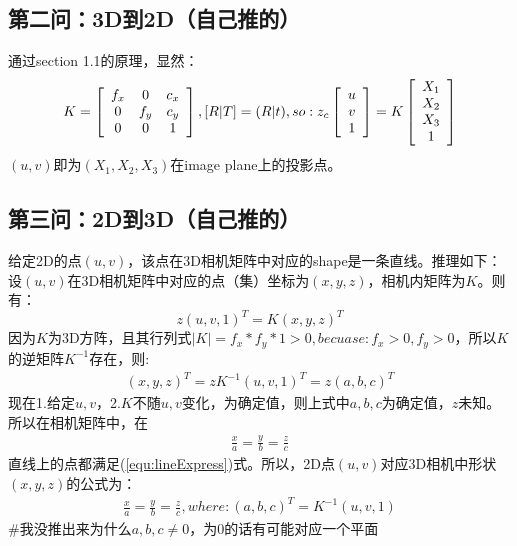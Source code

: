 \documentclass[UTF8]{ctexart}
\begin{document}
\subsection{第二问：3D到2D（自己推的）}
通过section 1.1的原理，显然：
\begin{align*}
K = \left [ \begin{array}{ c c c}
f_x & 0   & c_x \\
0  & f_y & c_y \\
0  & 0   & 1 \\
\end{array} \right ],
[R|T]=(R|t), so:
 z_c \left[ \begin{array}{c}  u \\ v \\ 1 \end{array} \right] =
 K \left[ \begin{array}{c}   X_1 \\  X_2 \\  X_3 \\ 1  \end{array}\right]
\end{align*}
$(u,v)$即为$(X_1,X_2,X_3)$在image plane上的投影点。
\subsection{第三问：2D到3D（自己推的）}
给定2D的点$(u,v)$，该点在3D相机矩阵中对应的shape是一条直线。推理如下：
设$(u,v)$在3D相机矩阵中对应的点（集）坐标为$(x,y,z)$，相机内矩阵为$K$。则有：
$$z(u,v,1)^T=K(x,y,z)^T$$
因为$K$为3D方阵，且其行列式$|K|=f_x*f_y*1>0, becuase:f_x>0, f_y>0$，所以$K$的逆矩阵$K^{-1}$存在，则:
\begin{align}
(x,y,z)^T=zK^{-1}(u,v,1)^T=z(a,b,c)^T\label{equ:lineExpress}
\end{align}
现在1.给定$u,v$，2.$K$不随$u,v$变化，为确定值，则上式中$a,b,c$为确定值，$z$未知。所以在相机矩阵中，在
\begin{align}
\frac{x}{a}=\frac{y}{b}=\frac{z}{c}
\end{align}
直线上的点都满足(\ref{equ:lineExpress})式。所以，2D点$(u,v)$对应3D相机中形状$(x,y,z)$的公式为：
\begin{align}
\frac{x}{a}=\frac{y}{b}=\frac{z}{c},where:(a,b,c)^T=K^{-1}(u,v,1)\label{formula:pixel2camera3D}
\end{align}
\#我没推出来为什么$a,b,c\neq0$，为0的话有可能对应一个平面
\end{document}
